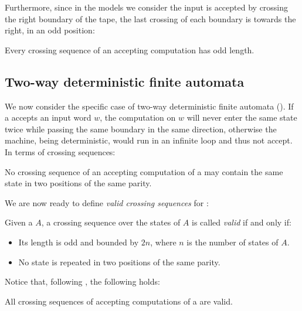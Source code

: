 Furthermore, since in the models we consider the input is accepted by crossing the right boundary of the tape, the last crossing of each boundary is towards the right, \ie in an odd position:
\begin{fact}\label{fact:crossing-length}
	Every crossing sequence of an accepting computation has odd length.
\end{fact}


\subsection{Two-way deterministic finite automata}
We now consider the specific case of two-way deterministic finite automata (\TDFAs).
If a \TDFA accepts an input word $w$, the computation on $w$ will never enter the same state twice while passing the same boundary in the same direction, otherwise the machine, being deterministic, would run in an infinite loop and thus not accept.
In terms of crossing sequences:
\begin{fact}\label{fact:crossing-2DFA-parity}
	No crossing sequence of an accepting computation of a \TDFA may contain the same state in two positions of the same parity.
\end{fact}

We are now ready to define \emph{valid crossing sequences} for \TDFAs:
\begin{defn}\label{def:validcrossing2DFA}
	Given a \TDFA $A$, a crossing sequence over the states of $A$ is called \emph{valid} if and only if:
	\begin{itemize}
		\item Its length is odd and bounded by $2n$, where $n$ is the number of states of $A$.
		\item No state is repeated in two positions of the same parity.
	\end{itemize}
\end{defn}

Notice that, following , the following holds:
\begin{fact}
	All crossing sequences of accepting computations of a \TDFA are valid.
\end{fact}

